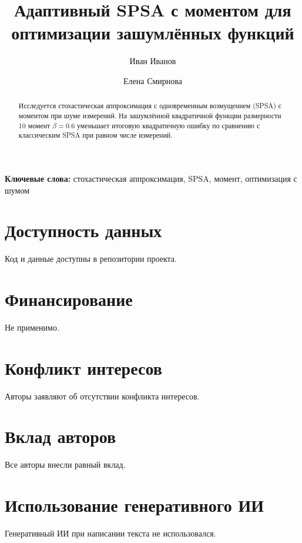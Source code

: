 \documentclass[11pt]{article}
\title{Адаптивный SPSA с моментом для оптимизации зашумлённых функций}
\author[1]{Иван Иванов}
\author[1]{Елена Смирнова}
\affil[1]{Лаборатория стохастической оптимизации, Университет-Пример}
\newcommand{\keywords}[1]{\par\noindent\textbf{Ключевые слова:} #1}
\begin{document}
\maketitle

\begin{abstract}
Исследуется стохастическая аппроксимация с одновременным возмущением (SPSA) с моментом при шуме измерений. На зашумлённой квадратичной функции размерности 10 момент $\beta = 0.6$ уменьшает итоговую квадратичную ошибку по сравнению с классическим SPSA при равном числе измерений.
\end{abstract}
\keywords{стохастическая аппроксимация, SPSA, момент, оптимизация с шумом}







\section*{Доступность данных}
Код и данные доступны в репозитории проекта.

\section*{Финансирование}
Не применимо.

\section*{Конфликт интересов}
Авторы заявляют об отсутствии конфликта интересов.

\section*{Вклад авторов}
Все авторы внесли равный вклад.

\section*{Использование генеративного ИИ}
Генеративный ИИ при написании текста не использовался.



\end{document}
